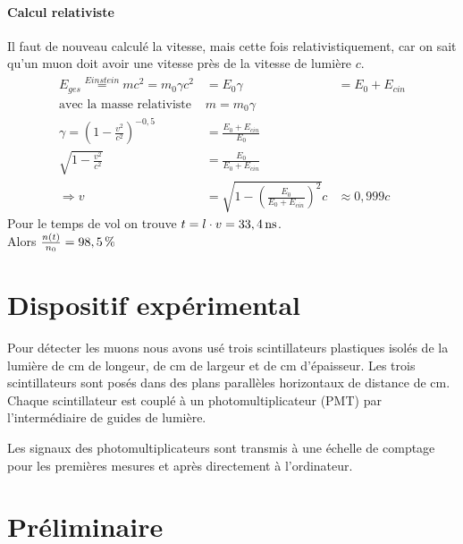 \documentclass[a4paper,11pt,liststotocnumbered,bibtotocnumbered]{scrartcl}
\begin{document}
   \paragraph{Calcul relativiste}
   Il faut de nouveau calculé la vitesse, mais cette fois relativistiquement, car on sait qu'un muon doit avoir une vitesse près de la vitesse de lumière $c$. 
   \begin{eqnarray*}
    E_{ges}\stackrel{Einstein}{=}mc^2=m_0\gamma c^2&=E_0\gamma &=E_0+E_{cin}\\
    \text{avec la masse relativiste }&m=m_0\gamma&\\
    \gamma=\left(1-\frac{v^2}{c^2}\right)^{-0,5}&=\frac{E_0+E_{cin}}{E_0}&\\
    \sqrt{1-\frac{v^2}{c^2}}&=\frac{E_0}{E_0+E_{cin}}&\\
    \Rightarrow v&=\sqrt{1-\left(\frac{E_0}{E_0+E_{cin}}\right)^2}c&\approx 0,999c
   \end{eqnarray*}
   Pour le temps de vol on trouve $t=l\cdot v=\unit[33,4]{ns}$.\\
   Alors $\frac{n(t)}{n_0}=\unit[98,5]{\%}$
 

 \section{Dispositif expérimental}
  Pour détecter les muons nous avons usé trois scintillateurs plastiques isolés de la lumière de \unit[100]{cm} de longeur, de \unit[20]{cm} de largeur et de \unit[0,8]{cm} d'épaisseur. Les trois scintillateurs sont posés dans des plans parallèles horizontaux de distance de \unit[20]{cm}. Chaque scintillateur est couplé à un photomultiplicateur (PMT) par l'intermédiaire de guides de lumière. 

  Les signaux des photomultiplicateurs sont transmis à une échelle de comptage pour les premières mesures et après directement à l'ordinateur.  

 \section{Préliminaire}
\end{document}
